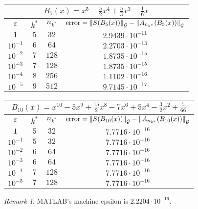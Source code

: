 \documentclass[final]{elsarticle}
\theoremstyle{definition}
\theoremstyle{remark}
\newtheorem{rem}{Remark}
\begin{document}
\begin{center}
\begin{tabular}{|c|c|c|c|}
  \hline
  \multicolumn{4}{|c|}{$B_5(x)=x^5-\frac{5}{2}x^4+\frac{5}{3}x^3-\frac{1}{6}x$} \\
  \hline
  $\varepsilon$ & $k^*$ & $n_{k^*}$ & $\operatorname{error}=\norm[\cg]{S(B_5(x))}-\norm[\cg]{A_{n_{k^*}}(B_5(x))}$ \\
  \hline
  $1$ & $5$ & $32$ & $2.9439\cdot10^{-11}$ \\
  $10^{-1}$ & $6$ & $64$ & $2.2703\cdot10^{-13}$ \\
  $10^{-2}$ & $7$ & $128$ & $1.8735\cdot10^{-15}$ \\
  $10^{-3}$ & $7$ & $128$ & $1.8735\cdot10^{-15}$ \\
  $10^{-4}$ & $8$ & $256$ & $1.1102\cdot10^{-16}$ \\
  $10^{-5}$ & $9$ & $512$ & $9.7145\cdot10^{-17}$ \\
  \hline
\end{tabular}
\end{center}

\begin{center}
\begin{tabular}{|c|c|c|c|}
  \hline
  \multicolumn{4}{|c|}{$B_{10}(x)=x^{10}-5x^9+\frac{15}{2}x^8-7x^6+5x^4-\frac{3}{2}x^2+\frac{5}{66}$} \\
  \hline
  $\varepsilon$ & $k^*$ & $n_{k^*}$ & $\operatorname{error}=\norm[\cg]{S(B_{10}(x))}-\norm[\cg]{A_{n_{k^*}}(B_{10}(x))}$ \\
  \hline
  $1$ & $5$ & $32$ & $7.7716\cdot10^{-16}$ \\
  $10^{-1}$ & $5$ & $32$ & $7.7716\cdot10^{-16}$ \\
  $10^{-2}$ & $6$ & $64$ & $7.7716\cdot10^{-16}$ \\
  $10^{-3}$ & $6$ & $64$ & $7.7716\cdot10^{-16}$ \\
  $10^{-4}$ & $7$ & $128$ & $7.7716\cdot10^{-16}$ \\
  $10^{-5}$ & $7$ & $128$ & $7.7716\cdot10^{-16}$ \\
  \hline
\end{tabular}
\end{center}

\begin{rem}
MATLAB's machine epsilon is $2.2204\cdot10^{-16}$.
\end{rem}
\end{document}
